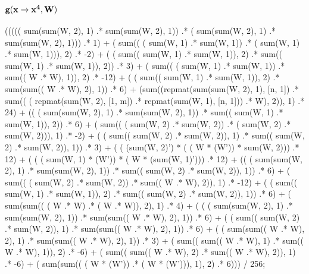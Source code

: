 \documentclass{article}
\begin{document}
\subsection{{$\bf g(x \rightarrow x^4, W)$}}
             ((((( sum(sum(W, 2), 1) .* sum(sum(W, 2), 1))  .* ( sum(sum(W, 2), 1) .* sum(sum(W, 2), 1)))  .* 1)  
              + ( sum(( ( sum(W, 1) .* sum(W, 1)) .* ( sum(W, 1) .* sum(W, 1))), 2) .* -2)  
              + ( ( sum(( sum(W, 1) .* sum(W, 1)), 2) .* sum(( sum(W, 1) .* sum(W, 1)), 2)) .* 3)  
              + ( sum(( ( sum(W, 1) .* sum(W, 1)) .* sum(( W .* W), 1)), 2) .* -12)  
              + ( ( sum(( sum(W, 1) .* sum(W, 1)), 2) .* sum(sum(( W .* W), 2), 1)) .* 6)  
              + (sum((repmat(sum(sum(W, 2), 1), [n, 1])  .* sum(( ( repmat(sum(W, 2), [1, m]) .* repmat(sum(W, 1), [n, 1])) .* W), 2)), 1)  .* 24)  
              + (( ( sum(sum(W, 2), 1) .* sum(sum(W, 2), 1)) .* sum(( sum(W, 1) .* sum(W, 1)), 2))  .* 6)  
              + ( sum(( ( sum(W, 2) .* sum(W, 2)) .* ( sum(W, 2) .* sum(W, 2))), 1) .* -2)  
              + ( ( sum(( sum(W, 2) .* sum(W, 2)), 1) .* sum(( sum(W, 2) .* sum(W, 2)), 1)) .* 3)  
              + ( ( (sum(W, 2)') * ( ( W * (W')) * sum(W, 2))) .* 12)  
              + ( ( ( sum(W, 1) * (W')) * ( W * (sum(W, 1)'))) .* 12)  
              + (( ( sum(sum(W, 2), 1) .* sum(sum(W, 2), 1)) .* sum(( sum(W, 2) .* sum(W, 2)), 1))  .* 6)  
              + ( sum(( ( sum(W, 2) .* sum(W, 2)) .* sum(( W .* W), 2)), 1) .* -12)  
              + ( ( sum(( sum(W, 1) .* sum(W, 1)), 2) .* sum(( sum(W, 2) .* sum(W, 2)), 1)) .* 6)  
              + ( sum(sum(( ( W .* W) .* ( W .* W)), 2), 1) .* 4)  
              + ( ( ( sum(sum(W, 2), 1) .* sum(sum(W, 2), 1)) .* sum(sum(( W .* W), 2), 1)) .* 6)  
              + ( ( sum(( sum(W, 2) .* sum(W, 2)), 1) .* sum(sum(( W .* W), 2), 1)) .* 6)  
              + ( ( sum(sum(( W .* W), 2), 1) .* sum(sum(( W .* W), 2), 1)) .* 3)  
              + ( sum(( sum(( W .* W), 1) .* sum(( W .* W), 1)), 2) .* -6)  
              + ( sum(( sum(( W .* W), 2) .* sum(( W .* W), 2)), 1) .* -6)   
              + ( sum(sum(( ( W * (W')) .* ( W * (W'))), 1), 2) .* 6))) / 256;
\end{document}
